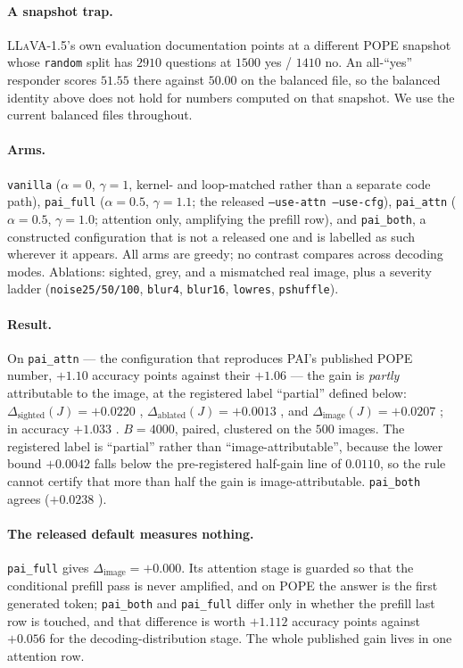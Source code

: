 \paragraph{A snapshot trap.} \textsc{LLaVA-1.5}'s own evaluation documentation points at a
different POPE snapshot whose \texttt{random} split has $2910$ questions at $1500$ yes / $1410$ no.
An all-``yes'' responder scores $51.55$ there against $50.00$ on the balanced file, so the balanced
identity above does not hold for numbers computed on that snapshot. We use the current balanced
files throughout.

\paragraph{Arms.} \texttt{vanilla} ($\alpha = 0$, $\gamma = 1$, kernel- and loop-matched rather than
a separate code path), \texttt{pai\_full} ($\alpha = 0.5$, $\gamma = 1.1$; the released
\texttt{--use-attn --use-cfg}), \texttt{pai\_attn} ($\alpha = 0.5$, $\gamma = 1.0$; attention only,
amplifying the prefill row), and \texttt{pai\_both}, a constructed configuration that is not a
released one and is labelled as such wherever it appears. All arms are greedy; no contrast compares
across decoding modes. Ablations: sighted, grey, and a mismatched real image, plus a severity ladder
(\texttt{noise25/50/100}, \texttt{blur4}, \texttt{blur16}, \texttt{lowres}, \texttt{pshuffle}).

\paragraph{Result.} On \texttt{pai\_attn} --- the configuration that reproduces PAI's published POPE
number, $+1.10$ accuracy points against their $+1.06$ --- the gain is \emph{partly} attributable to
the image, at the registered label ``partial'' defined below:
$\Delta_{\text{sighted}}(J) = +0.0220$ , $\Delta_{\text{ablated}}(J) = +0.0013$
, and $\Delta_{\text{image}}(J) = +0.0207$ ; in accuracy
$+1.033$ . $B = 4000$, paired, clustered on the $500$ images. The registered label
is ``partial'' rather than ``image-attributable'', because the lower bound $+0.0042$ falls
below the pre-registered half-gain line of $0.0110$, so the rule cannot certify that more than half
the gain is image-attributable. \texttt{pai\_both} agrees ($+0.0238$ ).

\paragraph{The released default measures nothing.} \texttt{pai\_full} gives
$\Delta_{\text{image}} = +0.000$. Its attention stage is guarded so that the conditional prefill pass
is never amplified, and on POPE the answer is the first generated token; \texttt{pai\_both} and
\texttt{pai\_full} differ only in whether the prefill last row is touched, and that difference is
worth $+1.112$ accuracy points against $+0.056$ for the decoding-distribution stage. The whole
published gain lives in one attention row.

